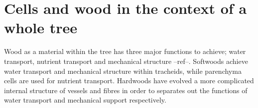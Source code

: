 \section{Cells and wood in the context of a whole tree}
Wood as a material within the tree has three major functions to achieve; water
transport, nutrient transport and mechanical structure --ref--. Softwoods
achieve water transport and mechanical structure within tracheids, while
parenchyma cells are used for nutrient transport. Hardwoods have evolved a more
complicated internal structure of vessels and fibres in order to separates out
the functions of water transport and mechanical support respectively.